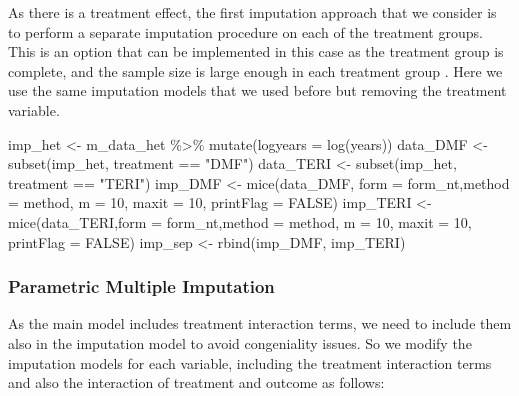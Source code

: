 \documentclass[
  letterpaper,
  DIV=11,
  numbers=noendperiod]{scrreprt}
\newenvironment{Shaded}{\begin{snugshade}}{\end{snugshade}}
\newcommand{\AttributeTok}[1]{\textcolor[rgb]{0.40,0.45,0.13}{#1}}
\newcommand{\ConstantTok}[1]{\textcolor[rgb]{0.56,0.35,0.01}{#1}}
\newcommand{\DecValTok}[1]{\textcolor[rgb]{0.68,0.00,0.00}{#1}}
\newcommand{\FunctionTok}[1]{\textcolor[rgb]{0.28,0.35,0.67}{#1}}
\newcommand{\NormalTok}[1]{\textcolor[rgb]{0.00,0.23,0.31}{#1}}
\newcommand{\OtherTok}[1]{\textcolor[rgb]{0.00,0.23,0.31}{#1}}
\newcommand{\SpecialCharTok}[1]{\textcolor[rgb]{0.37,0.37,0.37}{#1}}
\newcommand{\StringTok}[1]{\textcolor[rgb]{0.13,0.47,0.30}{#1}}
\begin{document}
As there is a treatment effect, the first imputation approach that we
consider is to perform a separate imputation procedure on each of the
treatment groups. This is an option that can be implemented in this case
as the treatment group is complete, and the sample size is large enough
in each treatment group \cite{zhang_should_2023}. Here we use the same
imputation models that we used before but removing the treatment
variable.

\begin{Shaded}
\begin{Highlighting}[]
\NormalTok{imp\_het }\OtherTok{\textless{}{-}}\NormalTok{  m\_data\_het }\SpecialCharTok{\%\textgreater{}\%} \FunctionTok{mutate}\NormalTok{(}\AttributeTok{logyears =} \FunctionTok{log}\NormalTok{(years))}
\NormalTok{data\_DMF  }\OtherTok{\textless{}{-}} \FunctionTok{subset}\NormalTok{(imp\_het, treatment }\SpecialCharTok{==} \StringTok{"DMF"}\NormalTok{)}
\NormalTok{data\_TERI  }\OtherTok{\textless{}{-}} \FunctionTok{subset}\NormalTok{(imp\_het, treatment }\SpecialCharTok{==} \StringTok{"TERI"}\NormalTok{)}
\NormalTok{imp\_DMF }\OtherTok{\textless{}{-}} \FunctionTok{mice}\NormalTok{(data\_DMF,  }\AttributeTok{form =}\NormalTok{ form\_nt,}\AttributeTok{method =}\NormalTok{ method, }\AttributeTok{m =} \DecValTok{10}\NormalTok{, }
                \AttributeTok{maxit =} \DecValTok{10}\NormalTok{, }\AttributeTok{printFlag =} \ConstantTok{FALSE}\NormalTok{)}
\NormalTok{imp\_TERI }\OtherTok{\textless{}{-}} \FunctionTok{mice}\NormalTok{(data\_TERI,}\AttributeTok{form =}\NormalTok{ form\_nt,}\AttributeTok{method =}\NormalTok{ method, }\AttributeTok{m =} \DecValTok{10}\NormalTok{, }
                 \AttributeTok{maxit =} \DecValTok{10}\NormalTok{, }\AttributeTok{printFlag =} \ConstantTok{FALSE}\NormalTok{)}
\NormalTok{imp\_sep }\OtherTok{\textless{}{-}}  \FunctionTok{rbind}\NormalTok{(imp\_DMF, imp\_TERI)}
\end{Highlighting}
\end{Shaded}

\hypertarget{parametric-multiple-imputation}{%
\subsubsection{Parametric Multiple
Imputation}\label{parametric-multiple-imputation}}

As the main model includes treatment interaction terms, we need to
include them also in the imputation model to avoid congeniality issues.
So we modify the imputation models for each variable, including the
treatment interaction terms and also the interaction of treatment and
outcome as follows:
\end{document}
